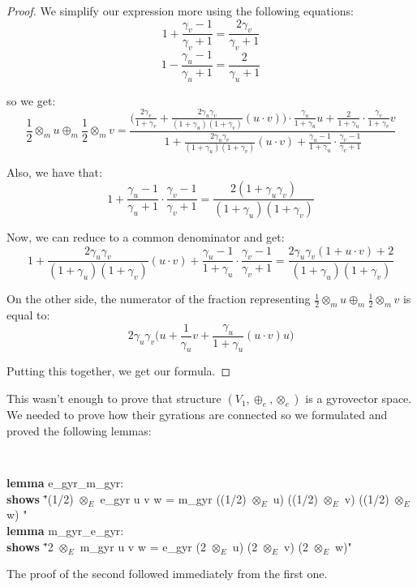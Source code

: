 \documentclass[a4paper]{article}
\theoremstyle{definition}
\begin{document}
\begin{proof}
We simplify our expression more using the following equations:
$$1+\frac{\gamma_v-1}{\gamma_v+1}=\frac{2\gamma_v}{\gamma_v+1}$$
$$1-\frac{\gamma_u-1}{\gamma_u+1}=\frac{2}{\gamma_u+1}$$

so we get:
$$\frac{1}{2}\otimes_m u \oplus_m \frac{1}{2} \otimes_m v =\frac{\Big( \frac{2\gamma_v}{1+\gamma_v}+\frac{2\gamma_u\gamma_v}{(1+\gamma_u)(1+\gamma_v)}(u\cdot v)\Big)\cdot\frac{\gamma_u}{1+\gamma_u}u + \frac{2}{1+\gamma_u}\cdot\frac{\gamma_v}{1+\gamma_v}v}{1+\frac{2\gamma_u\gamma_v}{(1+\gamma_u)(1+\gamma_v)}(u\cdot v)+\frac{\gamma_u-1}{1+\gamma_u}\cdot \frac{\gamma_v-1}{\gamma_v+1}}$$

Also, we have that:
$$1+\frac{\gamma_u-1}{\gamma_u+1}\cdot \frac{\gamma_v-1}{\gamma_v+1}= \frac{2(1+\gamma_u\gamma_v)}{(1+\gamma_u)(1+\gamma_v)}$$

Now, we can reduce to a common denominator and get:
$$1+\frac{2\gamma_u\gamma_v}{(1+\gamma_u)(1+\gamma_v)}(u\cdot v)+\frac{\gamma_u-1}{1+\gamma_u}\cdot \frac{\gamma_v-1}{\gamma_v+1} = \frac{2\gamma_u\gamma_v(1+u\cdot v) + 2}{(1+\gamma_u)(1+\gamma_v)}$$ 

On the other side, the numerator of the fraction representing $\frac{1}{2}\otimes_m u \oplus_m \frac{1}{2} \otimes_m v$ is equal to:
$$2\gamma_u\gamma_v\Big(u+\frac{1}{\gamma_u}v+\frac{\gamma_u}{1+\gamma_u}(u \cdot v)u\Big)$$

Putting this together, we get our formula.

\end{proof}

This wasn't enough to prove that structure $(V_1, \oplus_e, \otimes_e)$ is a gyrovector space. We needed to prove how their gyrations are connected so we formulated and proved the following lemmas:

{\tt
\begin{footnotesize}
\begin{tabbing}
{\bf lemma} e\_gyr\_m\_gyr:\\
{\bf shows} \="(1/2) $\otimes_E$ e\_gyr u v w = m\_gyr ((1/2) $\otimes_E$ u) ((1/2) $\otimes_E$ v) ((1/2) $\otimes_E$ w) "\\
{\bf lemma} m\_gyr\_e\_gyr:\\
{\bf shows} \="2 $\otimes_E$ m\_gyr u v w = e\_gyr (2 $\otimes_E$ u) (2 $\otimes_E$ v) (2 $\otimes_E$ w)"\\
\end{tabbing}
\end{footnotesize}
}

The proof of the second followed immediately from the first one.
\end{document}
